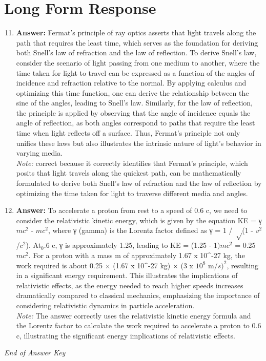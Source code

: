 \documentclass[12pt]{article}
\begin{document}
\section*{Long Form Response}
\begin{enumerate}[label=\arabic*.]
\setcounter{enumi}{10}
\item \textbf{Answer:} Fermat's principle of ray optics asserts that light travels along the path that requires the least time, which serves as the foundation for deriving both Snell's law of refraction and the law of reflection. To derive Snell's law, consider the scenario of light passing from one medium to another, where the time taken for light to travel can be expressed as a function of the angles of incidence and refraction relative to the normal. By applying calculus and optimizing this time function, one can derive the relationship between the sine of the angles, leading to Snell's law. Similarly, for the law of reflection, the principle is applied by observing that the angle of incidence equals the angle of reflection, as both angles correspond to paths that require the least time when light reflects off a surface. Thus, Fermat's principle not only unifies these laws but also illustrates the intrinsic nature of light's behavior in varying media.
\\ \textit{Note:} correct because it correctly identifies that Fermat's principle, which posits that light travels along the quickest path, can be mathematically formulated to derive both Snell's law of refraction and the law of reflection by optimizing the time taken for light to traverse different media and angles.
\item \textbf{Answer:} To accelerate a proton from rest to a speed of 0.6 c, we need to consider the relativistic kinetic energy, which is given by the equation KE = γ$mc^2$ - $mc^2$, where γ (gamma) is the Lorentz factor defined as γ = 1 / \ensuremath{\sqrt}(1 - $v^2$/$c^2$). At$_{0}$.6 c, γ is approximately 1.25, leading to KE = (1.25 - $1)mc^2$ = 0.25 $mc^2$. For a proton with a mass m of approximately 1.67 x 10^-27 kg, the work required is about 0.25 \ensuremath{\times} (1.67 x 10^-27 kg) \ensuremath{\times} (3 x $10^8$ m/$s)^2$, resulting in a significant energy requirement. This illustrates the implications of relativistic effects, as the energy needed to reach higher speeds increases dramatically compared to classical mechanics, emphasizing the importance of considering relativistic dynamics in particle acceleration.
\\ \textit{Note:} The answer correctly uses the relativistic kinetic energy formula and the Lorentz factor to calculate the work required to accelerate a proton to 0.6 c, illustrating the significant energy implications of relativistic effects.
\end{enumerate}

\vfill
\noindent\textit{End of Answer Key}
\end{document}
